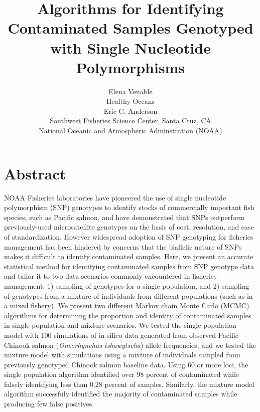 \documentclass[12pt]{article}
\begin{document}
\normalem

\setlength{\parindent}{0cm}
\title{\textbf{Algorithms for Identifying Contaminated Samples Genotyped with Single Nucleotide Polymorphisms}}
\author{\Large Elena Venable\\ 
	Healthy Oceans\\
	Eric C. Anderson\\
	Southwest Fisheries Science Center, Santa Cruz, CA\\
	National Oceanic and Atmospheric Adminstration (NOAA)
  \date{}}
\maketitle

\section*{Abstract} 
NOAA Fisheries laboratories have pioneered the use of single nucleotide polymorphism (SNP) genotypes to identify stocks of commercially important fish species, such as Pacific salmon, and have demonstrated that SNPs outperform previously-used microsatellite genotypes on the basis of cost, resolution, and ease of standardization. However widespread adoption of SNP genotyping for fisheries management has been hindered by concerns that the biallelic nature of SNPs makes it difficult to identify contaminated samples. Here, we present an accurate statistical method for identifying contaminated samples from SNP genotype data and tailor it to two data scenarios commonly encountered in fisheries management: 1) sampling of genotypes for a single population, and 2) sampling of genotypes from a mixture of individuals from different populations (such as in a mixed fishery). We present two different Markov chain Monte Carlo (MCMC) algorithms for determining the proportion and identity of contaminated samples in single population and mixture scenarios. We tested the single population model with 100 simulations of in silico data generated from observed Pacific Chinook salmon (\textit{Oncorhynchus tshawytscha}) allele frequencies, and we tested the mixture model with simulations using a mixture of individuals sampled from previously genotyped Chinook salmon baseline data. Using 60 or more loci, the single population algorithm identified over 98 percent of contaminated while falsely identifying less than 0.28 percent of samples.  Similarly, the mixture model algorithm successfuly identified the majority of contaminated samples while producing few false positives.   
\end{document}
